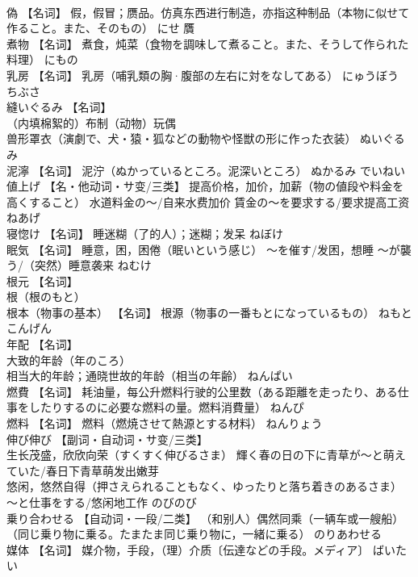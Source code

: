 \documentclass[8pt]{extreport}
\begin{document}
\begin{CJK}{UTF8}{min}
\\	偽	【名词】 假，假冒；赝品。仿真东西进行制造，亦指这种制品（本物に似せて作ること。また、そのもの）	にせ	贋
\\	煮物	【名词】 煮食，炖菜（食物を調味して煮ること。また、そうして作られた料理）	にもの	
\\	乳房	【名词】 乳房（哺乳類の胸·腹部の左右に対をなしてある）	にゅうぼう ちぶさ	
\\	縫いぐるみ	【名词】 
\\	（内填棉絮的）布制（动物）玩偶 
\\	兽形罩衣（演劇で、犬・猿・狐などの動物や怪獣の形に作った衣装）	ぬいぐるみ	
\\	泥濘	【名词】 泥泞（ぬかっているところ。泥深いところ）	ぬかるみ でいねい	
\\	値上げ	【名・他动词・サ变/三类】 提高价格，加价，加薪（物の値段や料金を高くすること） 水道料金の～/自来水费加价 賃金の～を要求する/要求提高工资	ねあげ	
\\	寝惚け	【名词】 睡迷糊（了的人）；迷糊；发呆	ねぼけ	
\\	眠気	【名词】 睡意，困，困倦（眠いという感じ） ～を催す/发困，想睡 ～が襲う/（突然）睡意袭来	ねむけ	
\\	根元	【名词】 
\\	根（根のもと） 
\\	根本（物事の基本） 【名词】 根源（物事の一番もとになっているもの）	ねもと こんげん	
\\	年配	【名词】 
\\	大致的年龄（年のころ） 
\\	相当大的年龄；通晓世故的年龄（相当の年齢）	ねんぱい	
\\	燃費	【名词】 耗油量，每公升燃料行驶的公里数（ある距離を走ったり、ある仕事をしたりするのに必要な燃料の量。燃料消費量）	ねんぴ	
\\	燃料	【名词】 燃料（燃焼させて熱源とする材料）	ねんりょう	
\\	伸び伸び	【副词・自动词・サ变/三类】 
\\	生长茂盛，欣欣向荣（すくすく伸びるさま） 輝く春の日の下に青草が～と萌えていた/春日下青草萌发出嫩芽 
\\	悠闲，悠然自得（押さえられることもなく、ゆったりと落ち着きのあるさま） ～と仕事をする/悠闲地工作	のびのび	
\\	乗り合わせる	【自动词・一段/二类】 （和别人）偶然同乘（一辆车或一艘船）（同じ乗り物に乗る。たまたま同じ乗り物に，一緒に乗る）	のりあわせる	
\\	媒体	【名词】 媒介物，手段，（理）介质〔伝達などの手段。メディア〕	ばいたい	

\end{CJK}
\end{document}
